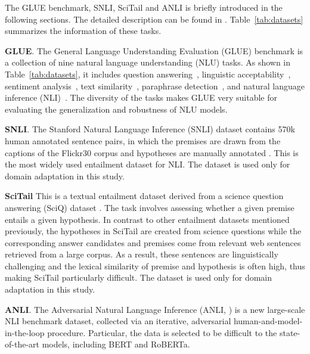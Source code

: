 \documentclass[11pt]{article} \usepackage{url}
\begin{document}
The GLUE benchmark, SNLI, SciTail and ANLI is briefly introduced in the following sections. The detailed description can be found in \cite{wang2018glue, snli2015, scitail, nie2019adversarial}. Table~\ref{tab:datasets} summarizes the information of these tasks. 

\noindent  \textbf{GLUE}. The General Language Understanding Evaluation (GLUE) benchmark is a collection of nine natural language understanding (NLU) tasks. As shown in Table~\ref{tab:datasets},
it includes question answering~\cite{squad1}, linguistic acceptability~\cite{cola2018}, sentiment analysis~\cite{sst2013}, text similarity~\cite{sts-b2017}, paraphrase detection~\cite{mrpc2005}, and natural language inference (NLI)~\cite{rte1,rte2,rte3,rte5,winograd2012,mnli2018}. The diversity of the tasks makes GLUE very suitable for evaluating the generalization and robustness of NLU models. 

\noindent  \textbf{SNLI}.
The Stanford Natural Language Inference (SNLI) dataset contains 570k human annotated sentence pairs, in which the premises are drawn from the captions of the Flickr30 corpus and hypotheses are manually annotated \cite{snli2015}. This is the most widely used entailment dataset for NLI.
The dataset is used only for domain adaptation in this study.

\noindent  \textbf{SciTail}
This is a textual entailment dataset derived from a science question answering (SciQ) dataset \cite{scitail}. The task involves assessing whether a given premise entails a given hypothesis.  
In contrast to other entailment datasets mentioned previously, the hypotheses in SciTail are created from science questions while the corresponding answer candidates and premises come from relevant web sentences retrieved from a large corpus. As a result, these sentences are linguistically challenging and the lexical similarity of premise and hypothesis is often high, thus making SciTail particularly difficult. 
The dataset is used only for domain adaptation in this study.

\noindent  \textbf{ANLI}.
The Adversarial Natural Language Inference (ANLI, \citet{nie2019adversarial}) is a new large-scale NLI benchmark dataset, collected via an iterative, adversarial human-and-model-in-the-loop procedure. Particular, the data is selected to be difficult to the state-of-the-art models, including BERT and RoBERTa.
\end{document}
